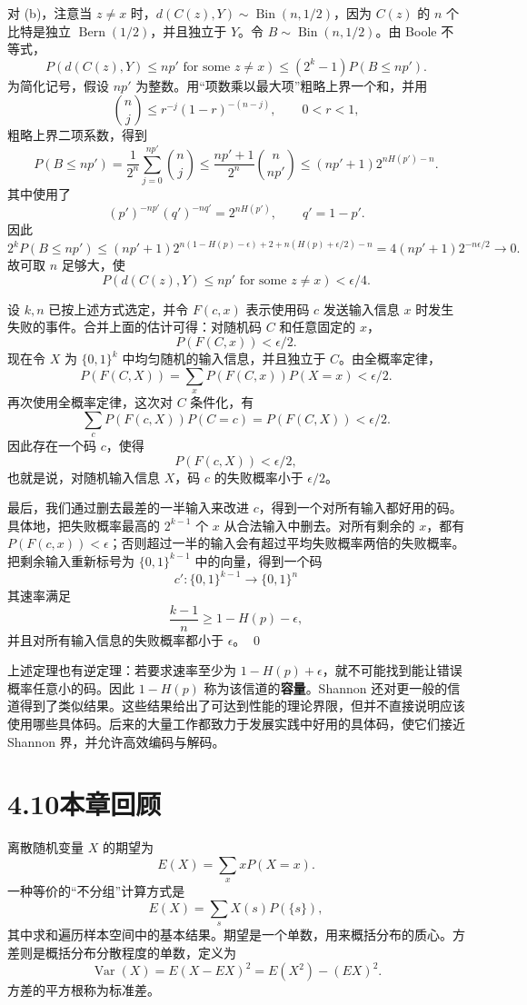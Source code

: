 \documentclass[UTF8, 12pt, fontset=fandol, oneside]{ctexart}
\begin{document}
对 (b)，注意当 $z\ne x$ 时，$d(C(z),Y)\sim\operatorname{Bin}(n,1/2)$，因为 $C(z)$ 的 $n$ 个比特是独立 $\operatorname{Bern}(1/2)$，并且独立于 $Y$。令 $B\sim\operatorname{Bin}(n,1/2)$。由 Boole 不等式，
\[
  P(d(C(z),Y)\le np'\text{ for some }z\ne x)
  \le (2^k-1)P(B\le np').
\]
为简化记号，假设 $np'$ 为整数。用“项数乘以最大项”粗略上界一个和，并用
\[
  \binom{n}{j}\le r^{-j}(1-r)^{-(n-j)},\qquad 0<r<1,
\]
粗略上界二项系数，得到
\[
  P(B\le np')
  =\frac{1}{2^n}\sum_{j=0}^{np'}\binom{n}{j}
  \le \frac{np'+1}{2^n}\binom{n}{np'}
  \le (np'+1)2^{nH(p')-n}.
\]
其中使用了
\[
  (p')^{-np'}(q')^{-nq'}=2^{nH(p')},\qquad q'=1-p'.
\]
因此
\[
  2^kP(B\le np')
  \le (np'+1)2^{n(1-H(p)-\epsilon)+2+n(H(p)+\epsilon/2)-n}
  =4(np'+1)2^{-n\epsilon/2}\to 0.
\]
故可取 $n$ 足够大，使
\[
  P(d(C(z),Y)\le np'\text{ for some }z\ne x)<\epsilon/4.
\]

设 $k,n$ 已按上述方式选定，并令 $F(c,x)$ 表示使用码 $c$ 发送输入信息 $x$ 时发生失败的事件。合并上面的估计可得：对随机码 $C$ 和任意固定的 $x$，
\[
  P(F(C,x))<\epsilon/2.
\]
现在令 $X$ 为 $\{0,1\}^k$ 中均匀随机的输入信息，并且独立于 $C$。由全概率定律，
\[
  P(F(C,X))=\sum_x P(F(C,x))P(X=x)<\epsilon/2.
\]
再次使用全概率定律，这次对 $C$ 条件化，有
\[
  \sum_c P(F(c,X))P(C=c)=P(F(C,X))<\epsilon/2.
\]
因此存在一个码 $c$，使得
\[
  P(F(c,X))<\epsilon/2,
\]
也就是说，对随机输入信息 $X$，码 $c$ 的失败概率小于 $\epsilon/2$。

最后，我们通过删去最差的一半输入来改进 $c$，得到一个对所有输入都好用的码。具体地，把失败概率最高的 $2^{k-1}$ 个 $x$ 从合法输入中删去。对所有剩余的 $x$，都有 $P(F(c,x))<\epsilon$；否则超过一半的输入会有超过平均失败概率两倍的失败概率。把剩余输入重新标号为 $\{0,1\}^{k-1}$ 中的向量，得到一个码
\[
  c':\{0,1\}^{k-1}\to\{0,1\}^n
\]
其速率满足
\[
  \frac{k-1}{n}\ge 1-H(p)-\epsilon,
\]
并且对所有输入信息的失败概率都小于 $\epsilon$。 \qed

上述定理也有逆定理：若要求速率至少为 $1-H(p)+\epsilon$，就不可能找到能让错误概率任意小的码。因此 $1-H(p)$ 称为该信道的\textbf{容量}。Shannon 还对更一般的信道得到了类似结果。这些结果给出了可达到性能的理论界限，但并不直接说明应该使用哪些具体码。后来的大量工作都致力于发展实践中好用的具体码，使它们接近 Shannon 界，并允许高效编码与解码。

\section*{4.10\quad 本章回顾}

离散随机变量 $X$ 的期望为
\[
  E(X)=\sum_x xP(X=x).
\]
一种等价的“不分组”计算方式是
\[
  E(X)=\sum_s X(s)P(\{s\}),
\]
其中求和遍历样本空间中的基本结果。期望是一个单数，用来概括分布的质心。方差则是概括分布分散程度的单数，定义为
\[
  \operatorname{Var}(X)=E(X-EX)^2=E(X^2)-(EX)^2.
\]
方差的平方根称为标准差。
\end{document}
